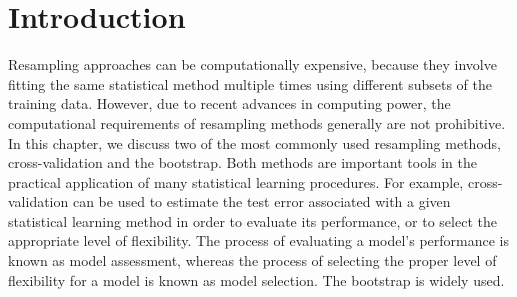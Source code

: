 \section{Introduction}


Resampling approaches can be computationally expensive, because they involve fitting the same statistical method multiple times using different subsets of the training data. However, due to recent advances in computing power, the computational requirements of resampling methods generally are not prohibitive. In this chapter, we discuss two of the most commonly used resampling methods, cross-validation and the bootstrap. Both methods are important tools in the practical application of many statistical learning procedures. For example, cross-validation can be used to estimate the test error associated with a given statistical learning method in order to evaluate its performance, or to select the appropriate level of flexibility. The process of evaluating a model’s performance is known as model assessment, whereas the process of selecting the proper level of flexibility for a model is known as model selection. The bootstrap is widely used.





